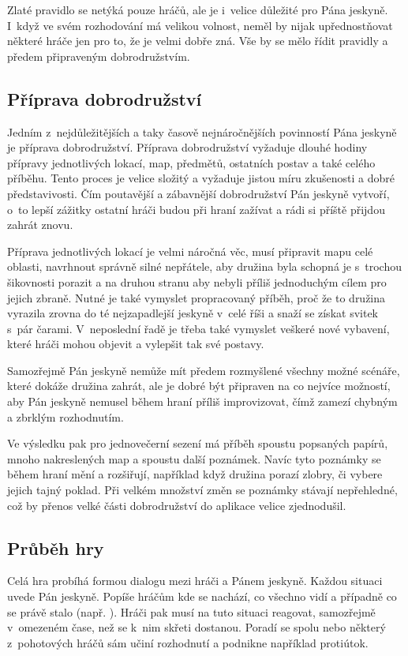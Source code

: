 \documentclass[thesis=B,czech]{resources/FITthesis}[2012/06/26]
\begin{document}
Zlaté pravidlo se netýká pouze hráčů, ale je i~velice důležité pro Pána jeskyně. I~když ve svém rozhodování má velikou volnost, neměl by nijak upřednostňovat některé hráče jen pro to, že je velmi dobře zná. Vše by se mělo řídit pravidly a předem připraveným dobrodružstvím. 


	\subsection{Příprava dobrodružství}
Jedním z~nejdůležitějších a taky časově nejnáročnějších povinností Pána jeskyně je příprava dobrodružství. Příprava dobrodružství vyžaduje dlouhé hodiny přípravy jednotlivých lokací, map, předmětů, ostatních postav a také celého příběhu. Tento proces je velice složitý a vyžaduje jistou míru zkušenosti a dobré představivosti. Čím poutavější a zábavnější dobrodružství Pán jeskyně vytvoří, o~to lepší zážitky ostatní hráči budou při hraní zažívat a rádi si příště přijdou zahrát znovu. \par

Příprava jednotlivých lokací je velmi náročná věc, musí připravit mapu celé oblasti, navrhnout správně silné nepřátele, aby družina byla schopná je s~trochou šikovnosti porazit a na druhou stranu aby nebyli příliš jednoduchým cílem pro jejich zbraně. Nutné je také vymyslet propracovaný příběh, proč že to družina vyrazila zrovna do té nejzapadlejší jeskyně v~celé říši a snaží se získat svitek s~pár čarami. V~neposlední řadě je třeba také vymyslet veškeré nové vybavení, které hráči mohou objevit a vylepšit tak své postavy. \par

Samozřejmě Pán jeskyně nemůže mít předem rozmyšlené všechny možné scénáře, které dokáže družina zahrát, ale je dobré být připraven na co nejvíce možností, aby Pán jeskyně nemusel během hraní příliš improvizovat, čímž zamezí chybným a zbrklým rozhodnutím. \par

Ve výsledku pak pro jednovečerní sezení má příběh spoustu popsaných papírů, mnoho nakreslených map a spoustu další poznámek. Navíc tyto poznámky se během hraní mění a rozšiřují, například když družina porazí zlobry, či vybere jejich tajný poklad. Při velkém množství změn se poznámky stávají nepřehledné, což by přenos velké části dobrodružství do aplikace velice zjednodušil. 
	
	\subsection{Průběh hry}
Celá hra probíhá formou dialogu mezi hráči a Pánem jeskyně. Každou situaci uvede Pán jeskyně. Popíše hráčům kde se nachází, co všechno vidí a případně co se právě stalo (např. ). Hráči pak musí na tuto situaci reagovat, samozřejmě v~omezeném čase, než se k~nim skřeti dostanou. Poradí se spolu nebo některý z~pohotových hráčů sám učiní rozhodnutí a podnikne například protiútok. \par
\end{document}
